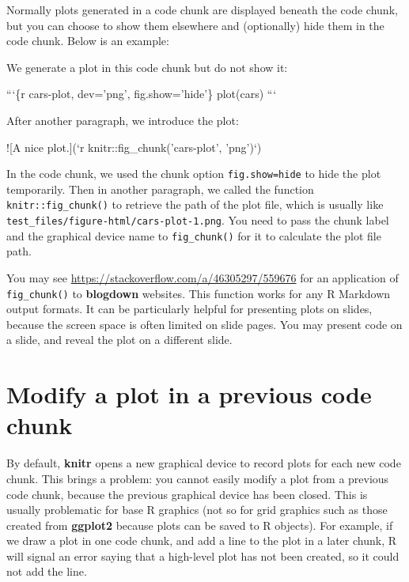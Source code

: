 \documentclass[
  11pt,
]{krantz}
\newenvironment{Shaded}{\begin{snugshade}}{\end{snugshade}}
\newcommand{\BaseNTok}[1]{\textcolor[rgb]{0.06,0.06,0.06}{#1}}
\newcommand{\NormalTok}[1]{#1}
\begin{document}
Normally plots generated in a code chunk are displayed beneath the code chunk, but you can choose to show them elsewhere and (optionally) hide them in the code chunk. Below is an example:

\begin{Shaded}
\begin{Highlighting}[]
\NormalTok{We generate a plot in this code chunk but do not show it:}

\BaseNTok{```\{r cars-plot, dev='png', fig.show='hide'\}}
\BaseNTok{plot(cars)}
\BaseNTok{```}

\NormalTok{After another paragraph, we introduce the plot:}

\NormalTok{![A nice plot.](}\BaseNTok{`r knitr::fig_chunk('cars-plot', 'png')`}\NormalTok{)}
\end{Highlighting}
\end{Shaded}

In the code chunk, we used the chunk option \texttt{fig.show=\textquotesingle{}hide\textquotesingle{}} to hide the plot temporarily. Then in another paragraph, we called the function \texttt{knitr::fig\_chunk()} to retrieve the path of the plot file, which is usually like \texttt{test\_files/figure-html/cars-plot-1.png}. You need to pass the chunk label and the graphical device name to \texttt{fig\_chunk()} for it to calculate the plot file path.

You may see \url{https://stackoverflow.com/a/46305297/559676} for an application of \texttt{fig\_chunk()} to \textbf{blogdown} websites. This function works for any R Markdown output formats. It can be particularly helpful for presenting plots on slides, because the screen space is often limited on slide pages. You may present code on a slide, and reveal the plot on a different slide.

\hypertarget{global-device}{%
\section{Modify a plot in a previous code chunk}\label{global-device}}

By default, \textbf{knitr} opens a new graphical device to record plots for each new code chunk. This brings a problem: you cannot easily modify a plot from a previous code chunk, because the previous graphical device has been closed. This is usually problematic for base R graphics (not so for grid graphics such as those created from \textbf{ggplot2} because plots can be saved to R objects). For example, if we draw a plot in one code chunk, and add a line to the plot in a later chunk, R will signal an error saying that a high-level plot has not been created, so it could not add the line.
\end{document}

